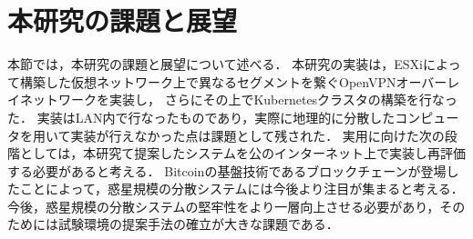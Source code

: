 \section{本研究の課題と展望}
\label{conclusion:issue}

本節では，本研究の課題と展望について述べる．
本研究の実装は，ESXiによって構築した仮想ネットワーク上で異なるセグメントを繋ぐOpenVPNオーバーレイネットワークを実装し，
さらにその上でKubernetesクラスタの構築を行なった．
実装はLAN内で行なったものであり，実際に地理的に分散したコンピュータを用いて実装が行えなかった点は課題として残された．
実用に向けた次の段階としては，本研究て提案したシステムを公のインターネット上で実装し再評価する必要があると考える．
Bitcoinの基盤技術であるブロックチェーンが登場したことによって，惑星規模の分散システムには今後より注目が集まると考える．
今後，惑星規模の分散システムの堅牢性をより一層向上させる必要があり，そのためには試験環境の提案手法の確立が大きな課題である．

